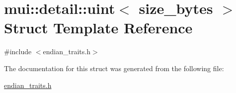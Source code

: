 \hypertarget{structmui_1_1detail_1_1uint}{}\section{mui\+:\+:detail\+:\+:uint$<$ size\+\_\+bytes $>$ Struct Template Reference}
\label{structmui_1_1detail_1_1uint}


{\ttfamily \#include $<$endian\+\_\+traits.\+h$>$}



The documentation for this struct was generated from the following file\+:\begin{DoxyCompactItemize}
\item 
\hyperlink{endian__traits_8h}{endian\+\_\+traits.\+h}\end{DoxyCompactItemize}
